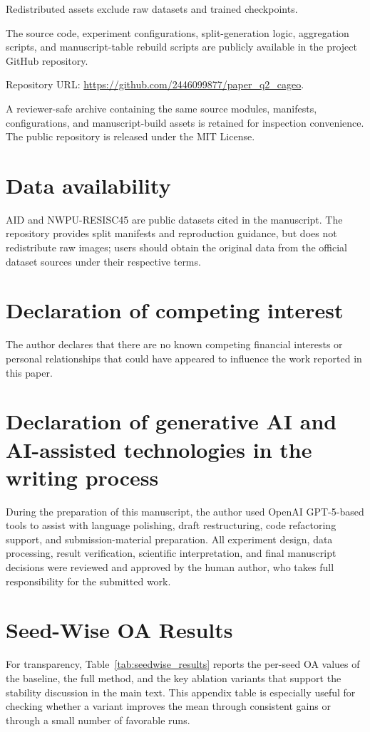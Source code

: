 \documentclass[a4paper,fleqn]{cas-sc}
\begin{document}
Redistributed assets exclude raw datasets and trained checkpoints.

The source code, experiment configurations, split-generation logic, aggregation scripts, and manuscript-table rebuild scripts are publicly available in the project GitHub repository.

Repository URL: \url{https://github.com/2446099877/paper_q2_cageo}.

A reviewer-safe archive containing the same source modules, manifests, configurations, and manuscript-build assets is retained for inspection convenience. The public repository is released under the MIT License.

\section*{Data availability}
AID and NWPU-RESISC45 are public datasets cited in the manuscript. The repository provides split manifests and reproduction guidance, but does not redistribute raw images; users should obtain the original data from the official dataset sources under their respective terms.

\section*{Declaration of competing interest}
The author declares that there are no known competing financial interests or personal relationships that could have appeared to influence the work reported in this paper.

\section*{Declaration of generative AI and AI-assisted technologies in the writing process}
During the preparation of this manuscript, the author used OpenAI GPT-5-based tools to assist with language polishing, draft restructuring, code refactoring support, and submission-material preparation. All experiment design, data processing, result verification, scientific interpretation, and final manuscript decisions were reviewed and approved by the human author, who takes full responsibility for the submitted work.

\section{Seed-Wise OA Results}
\label{sec:appendix_seedwise}

For transparency, Table~\ref{tab:seedwise_results} reports the per-seed OA values of the baseline, the full method, and the key ablation variants that support the stability discussion in the main text. This appendix table is especially useful for checking whether a variant improves the mean through consistent gains or through a small number of favorable runs.
\end{document}
